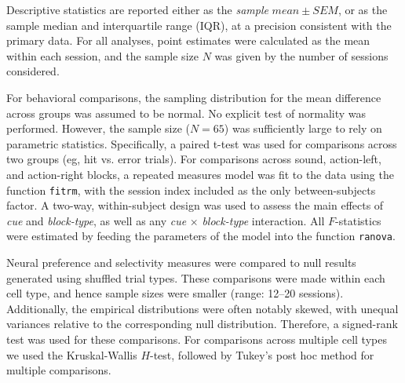 {Descriptive statistics are reported either as the \emph{sample} $mean \pm SEM$, or as the sample median and interquartile range (IQR), at a precision consistent with the primary data. For all analyses, point estimates were calculated as the mean within each session, and the sample size $N$ was given by the number of sessions considered. 

For behavioral comparisons, the sampling distribution for the mean difference across groups was assumed to be normal. No explicit test of normality was performed. However, the sample size  ($N=65$) was sufficiently large to rely on parametric statistics. Specifically, a paired t-test was used for comparisons across two groups (eg, hit vs. error trials). For comparisons across sound, action-left, and action-right blocks, a repeated measures model was fit to the data using the function \texttt{fitrm}, with the session index included as the only between-subjects factor. A two-way, within-subject design was used to assess the main effects of \emph{cue} and \emph{block-type}, as well as any \emph{cue} $\times$ \emph{block-type} interaction. All $F$-statistics were estimated by feeding the parameters of the model into the function \texttt{ranova}.

Neural preference and selectivity measures were compared to null results generated using shuffled trial types. These comparisons were made within each cell type, and hence sample sizes were smaller (range: 12--20 sessions). Additionally, the empirical distributions were often notably skewed, with unequal variances relative to the corresponding null distribution. Therefore, a signed-rank test was used for these comparisons. For comparisons across multiple cell types we used the Kruskal-Wallis $H$-test, followed by Tukey's post hoc method for multiple comparisons. 

}%

\showmatmethods{} %